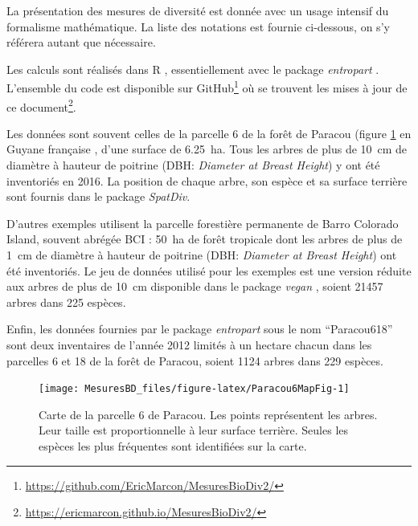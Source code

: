 \documentclass[
  11pt,
  french,
  a4paper,
  extrafontsizes,onecolumn,openright
  ]{memoir}
\newlength{\rf}
\begin{document}
La présentation des mesures de diversité est donnée avec un usage intensif du formalisme mathématique.
La liste des notations est fournie ci-dessous, on s'y référera autant que nécessaire.

Les calculs sont réalisés dans R \autocite{R}, essentiellement avec le package \emph{entropart} \autocite{Marcon2014c}.
L'ensemble du code est disponible sur GitHub\footnote{\url{https://github.com/EricMarcon/MesuresBioDiv2/}} où se trouvent les mises à jour de ce document\footnote{\url{https://ericmarcon.github.io/MesuresBioDiv2/}}.

Les données sont souvent celles de la parcelle 6 de la forêt de Paracou (figure \ref{fig:Paracou6MapFig} en Guyane française \autocite{Gourlet-Fleury2004}, d'une surface de 6.25~ha.
Tous les arbres de plus de 10~cm de diamètre à hauteur de poitrine (DBH: \emph{Diameter at Breast Height}) y ont été inventoriés en 2016.
La position de chaque arbre, son espèce et sa surface terrière sont fournis dans le package \emph{SpatDiv}.

D'autres exemples utilisent la parcelle forestière permanente de Barro Colorado Island, souvent abrégée BCI \autocite{Condit2012}: 50~ha de forêt tropicale dont les arbres de plus de 1~cm de diamètre à hauteur de poitrine (DBH: \emph{Diameter at Breast Height}) ont été inventoriés.
Le jeu de données utilisé pour les exemples est une version réduite aux arbres de plus de 10~cm disponible dans le package \emph{vegan} \autocite{Oksanen2012}, soient 21457 arbres dans 225 espèces.

Enfin, les données fournies par le package \emph{entropart} sous le nom \enquote{Paracou618} sont deux inventaires de l'année 2012 limités à un hectare chacun dans les parcelles 6 et 18 de la forêt de Paracou, soient 1124 arbres dans 229 espèces.



\scriptsize

\begin{figure}

{\centering \texttt{[image: MesuresBD\_files/figure-latex/Paracou6MapFig-1]} 

}

\caption{Carte de la parcelle 6 de Paracou. Les points représentent les arbres. Leur taille est proportionnelle à leur surface terrière. Seules les espèces les plus fréquentes sont identifiées sur la carte.}\label{fig:Paracou6MapFig}
\end{figure}

\normalsize
\end{document}

